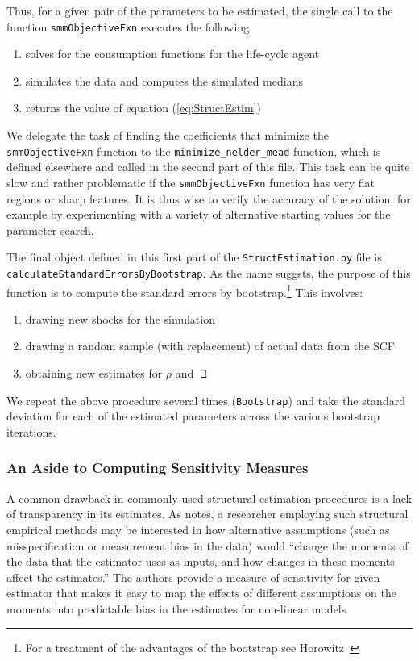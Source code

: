 Thus, for a given pair of the parameters to be estimated, the single
call to the function \texttt{smmObjectiveFxn} executes the following:
\begin{enumerate}
\item solves for the consumption functions for the life-cycle agent
\item simulates the data and computes the simulated medians
\item returns the value of equation (\ref{eq:StructEstim})
\end{enumerate}

We delegate the task of finding the coefficients that minimize the \texttt{smmObjectiveFxn} function to the \texttt{minimize\_nelder\_mead} function, which is defined elsewhere and called in the second part of this file.  This task can be quite slow and rather problematic if the \texttt{smmObjectiveFxn} function has very flat regions or sharp features. It is thus wise to verify the accuracy of the solution, for example by experimenting with a variety of alternative starting values for the parameter search.

The final object defined in this first part of the \texttt{StructEstimation.py}
file is \texttt{calculateStandardErrorsByBootstrap}. As the name suggsts, the
purpose of this function is to compute the standard errors by bootstrap.\footnote{For a
  treatment of the advantages of the bootstrap see
  Horowitz~\citeyearpar{horowitzBootstrap}} This involves:
\begin{enumerate}
\item drawing new shocks for the simulation
\item drawing a random sample (with replacement) of actual data from the SCF
\item obtaining new estimates for $\rho$ and ${\beth}$
\end{enumerate}
We repeat the above procedure several times (\texttt{Bootstrap}) and
take the standard deviation for each of the estimated parameters across the various bootstrap iterations.

\subsubsection{An Aside to Computing Sensitivity Measures}\label{subsubsec:sensmeas}


A common drawback in commonly used structural estimation procedures is a lack of transparency in its estimates.  As \cite{andrews2017measuring} notes, a researcher employing such structural empirical methods may be interested in how alternative assumptions (such as misspecification or measurement bias in the data) would ``change the moments of the data that the estimator uses as inputs, and how changes in these moments affect the estimates.'' The authors provide a measure of sensitivity for given estimator that makes it easy to map the effects of different assumptions on the moments into predictable bias in the estimates for non-linear models.

